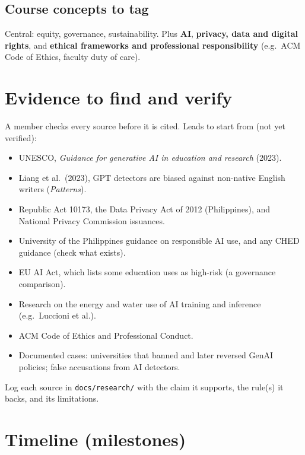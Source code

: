 \documentclass[11pt,a4paper]{article}
\newcommand{\code}[1]{\texttt{#1}}
\begin{document}
\subsection{Course concepts to tag}
Central: equity, governance, sustainability. Plus \textbf{AI}, \textbf{privacy, data and digital
rights}, and \textbf{ethical frameworks and professional responsibility} (e.g.\ ACM Code of Ethics,
faculty duty of care).

\section{Evidence to find and verify}\label{sec:evidence}

A member checks every source before it is cited. Leads to start from (not yet verified):
\begin{itemize}
  \item UNESCO, \emph{Guidance for generative AI in education and research} (2023).
  \item Liang et al.\ (2023), GPT detectors are biased against non-native English writers (\emph{Patterns}).
  \item Republic Act 10173, the Data Privacy Act of 2012 (Philippines), and National Privacy Commission issuances.
  \item University of the Philippines guidance on responsible AI use, and any CHED guidance (check what exists).
  \item EU AI Act, which lists some education uses as high-risk (a governance comparison).
  \item Research on the energy and water use of AI training and inference (e.g.\ Luccioni et al.).
  \item ACM Code of Ethics and Professional Conduct.
  \item Documented cases: universities that banned and later reversed GenAI policies; false
        accusations from AI detectors.
\end{itemize}
Log each source in \code{docs/research/} with the claim it supports, the rule(s) it backs, and its
limitations.

\section{Timeline (milestones)}
\end{document}
